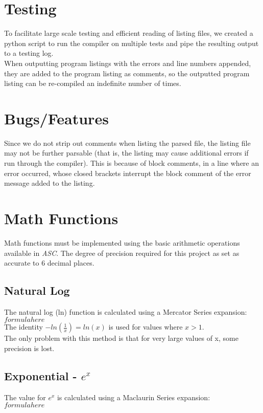 \documentclass{report}
\begin{document}
\section*{Testing}
To facilitate large scale testing and efficient reading of listing files, we created a python script to run the compiler on multiple tests and pipe the resulting output to a testing log.\\
When outputting program listings with the errors and line numbers appended, they are added to the program listing as comments, so the outputted program listing can be re-compiled an indefinite number of times.


\section*{Bugs/Features}
Since we do not strip out comments when listing the parsed file, the listing file may not be further parsable (that is, the listing may cause additional errors if run through the compiler). This is because of block comments, in a line where an error occurred, whose closed brackets interrupt the block comment of the error message added to the listing.

\section*{Math Functions}
Math functions must be implemented using the basic arithmetic operations available in \emph{ASC}. The degree of precision required for this project as set as accurate to 6 decimal places.
\subsection*{Natural Log}
The natural log (ln) function is calculated using a Mercator Series expansion:\\
$ formula here $ \\
The identity $ -ln(\frac{1}{x}) = ln(x)$ is used for values where $x > 1$.\\
The only problem with this method is that for very large values of x, some precision is lost. 

\subsection*{Exponential - $e^x$}
The value for $e^x$ is calculated using a Maclaurin Series expansion:\\
$ formula here $ \\
\end{document}
